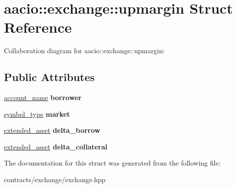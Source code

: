 \hypertarget{structaacio_1_1exchange_1_1upmargin}{}\section{aacio\+:\+:exchange\+:\+:upmargin Struct Reference}
\label{structaacio_1_1exchange_1_1upmargin}


Collaboration diagram for aacio\+:\+:exchange\+:\+:upmargin\+:
\subsection*{Public Attributes}
\begin{DoxyCompactItemize}
\item 
\mbox{\label{structaacio_1_1exchange_1_1upmargin_a8f616b20071e24245679ad85c4b6135e}} 
\mbox{\hyperlink{structaacio_1_1chain_1_1name}{account\+\_\+name}} {\bfseries borrower}
\item 
\mbox{\label{structaacio_1_1exchange_1_1upmargin_a0b52c632863b967bdc5b326ba317507f}} 
\mbox{\hyperlink{structaacio_1_1symbol__type}{symbol\+\_\+type}} {\bfseries market}
\item 
\mbox{\label{structaacio_1_1exchange_1_1upmargin_a0b67459fab53ff1ae9514b2dd948b717}} 
\mbox{\hyperlink{structaacio_1_1extended__asset}{extended\+\_\+asset}} {\bfseries delta\+\_\+borrow}
\item 
\mbox{\label{structaacio_1_1exchange_1_1upmargin_a9789aa023bdd7f34f9bbc397f991fa59}} 
\mbox{\hyperlink{structaacio_1_1extended__asset}{extended\+\_\+asset}} {\bfseries delta\+\_\+collateral}
\end{DoxyCompactItemize}


The documentation for this struct was generated from the following file\+:\begin{DoxyCompactItemize}
\item 
contracts/exchange/exchange.\+hpp\end{DoxyCompactItemize}
